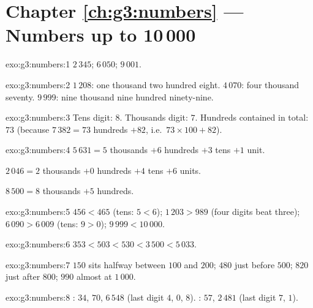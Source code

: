 \section*{Chapter \ref{ch:g3:numbers} --- Numbers up to 10\,000}

\begin{solution}{exo:g3:numbers:1}
$2\,345$; \quad $6\,050$; \quad $9\,001$.
\end{solution}

\begin{solution}{exo:g3:numbers:2}
$1\,208$: one thousand two hundred eight. \quad
$4\,070$: four thousand seventy. \quad
$9\,999$: nine thousand nine hundred ninety-nine.
\end{solution}

\begin{solution}{exo:g3:numbers:3}
Tens digit: $8$. Thousands digit: $7$. Hundreds contained in total:
$73$ (because $7\,382 = 73$ hundreds $+ 82$, i.e.\
$73 \times 100 + 82$).
\end{solution}

\begin{solution}{exo:g3:numbers:4}
$5\,631 = 5$ thousands $+ 6$ hundreds $+ 3$ tens $+ 1$ unit.

$2\,046 = 2$ thousands $+ 0$ hundreds $+ 4$ tens $+ 6$ units.

$8\,500 = 8$ thousands $+ 5$ hundreds.
\end{solution}

\begin{solution}{exo:g3:numbers:5}
$456 < 465$ (tens: $5 < 6$); \quad
$1\,203 > 989$ (four digits beat three); \quad
$6\,090 > 6\,009$ (tens: $9 > 0$); \quad
$9\,999 < 10\,000$.
\end{solution}

\begin{solution}{exo:g3:numbers:6}
$353 < 503 < 530 < 3\,500 < 5\,033$.
\end{solution}

\begin{solution}{exo:g3:numbers:7}
$150$ sits halfway between $100$ and $200$; $480$ just before
$500$; $820$ just after $800$; $990$ almost at $1\,000$.
\end{solution}

\begin{solution}{exo:g3:numbers:8}
: $34$, $70$, $6\,548$ (last digit $4$, $0$, $8$). : $57$,
$2\,481$ (last digit $7$, $1$).
\end{solution}

